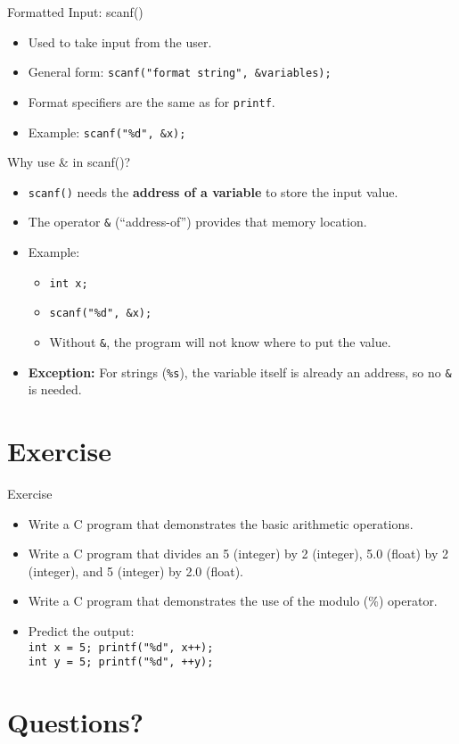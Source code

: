 \documentclass[12pt, aspectratio=169]{beamer}
\begin{document}
    \begin{frame}{Formatted Input: scanf()}
        \begin{itemize}
            \item Used to take input from the user.
            \item General form: \texttt{scanf("format string", \&variables);}
            \item Format specifiers are the same as for \texttt{printf}.
            \item Example: \texttt{scanf("\%d", \&x);}
        \end{itemize}
    \end{frame}


    \begin{frame}{Why use \& in scanf()?}
        \begin{itemize}
            \item \texttt{scanf()} needs the \textbf{address of a variable} to store the input value.
            \item The operator \texttt{\&} (“address-of”) provides that memory location.
            \item Example:
                \begin{itemize}
                    \item \texttt{int x;}
                    \item \texttt{scanf("\%d", \&x);}  %
                    \item Without \texttt{\&}, the program will not know where to put the value.
                \end{itemize}
            \item \textbf{Exception:} For strings (\texttt{\%s}), the variable itself is already an address, so no \texttt{\&} is needed.
        \end{itemize}
    \end{frame}


    \section{Exercise}

    \begin{frame}{Exercise}
        \begin{itemize}
            \item Write a C program that demonstrates the basic arithmetic operations.
            \item Write a C program that divides an 5 (integer) by 2 (integer), 5.0 (float) by 2 (integer), and 5 (integer) by 2.0 (float).
            \item Write a C program that demonstrates the use of the modulo (\%) operator.
            \item Predict the output:  \\
                \texttt{int x = 5; printf("\%d", x++);}  \\
                \texttt{int y = 5; printf("\%d", ++y);}
        \end{itemize}
    \end{frame}

    \section*{Questions?}
\end{document}
